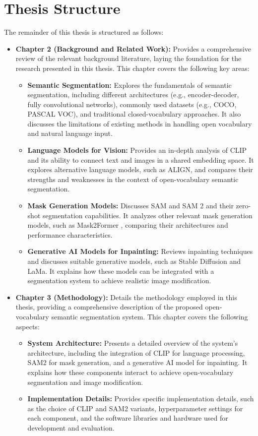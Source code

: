 \section{Thesis Structure}

The remainder of this thesis is structured as follows:

\begin{itemize}
\item \textbf{Chapter 2 (Background and Related Work):} Provides a comprehensive review of the relevant background literature, laying the foundation for the research presented in this thesis. This chapter covers the following key areas:
\begin{itemize}
\item \textbf{Semantic Segmentation:} Explores the fundamentals of semantic segmentation, including different architectures (e.g., encoder-decoder, fully convolutional networks), commonly used datasets (e.g., COCO, PASCAL VOC), and traditional closed-vocabulary approaches. It also discusses the limitations of existing methods in handling open vocabulary and natural language input.
\item \textbf{Language Models for Vision:} Provides an in-depth analysis of CLIP \cite{radford2021learning} and its ability to connect text and images in a shared embedding space. It explores alternative language models, such as ALIGN, and compares their strengths and weaknesses in the context of open-vocabulary semantic segmentation.
\item \textbf{Mask Generation Models:} Discusses SAM \cite{kirillov2023segment} and SAM 2 \cite{ravi2024sam2} and their zero-shot segmentation capabilities. It analyzes other relevant mask generation models, such as Mask2Former \cite{cheng2022mask2former}, comparing their architectures and performance characteristics.
\item \textbf{Generative AI Models for Inpainting:} Reviews inpainting techniques and discusses suitable generative models, such as Stable Diffusion \cite{rombach2022high} and LaMa. It explains how these models can be integrated with a segmentation system to achieve realistic image modification.
\end{itemize}

\item \textbf{Chapter 3 (Methodology):} Details the methodology employed in this thesis, providing a comprehensive description of the proposed open-vocabulary semantic segmentation system. This chapter covers the following aspects:
\begin{itemize}
\item \textbf{System Architecture:} Presents a detailed overview of the system's architecture, including the integration of CLIP for language processing, SAM2 for mask generation, and a generative AI model for inpainting. It explains how these components interact to achieve open-vocabulary segmentation and image modification.
\item \textbf{Implementation Details:} Provides specific implementation details, such as the choice of CLIP and SAM2 variants, hyperparameter settings for each component, and the software libraries and hardware used for development and evaluation.
\end{itemize}


\end{itemize}
